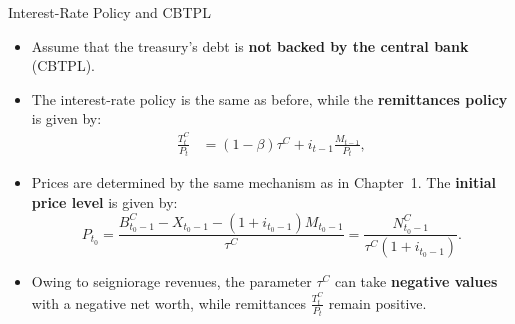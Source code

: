 \documentclass[11pt,aspectratio=169]{beamer}
\begin{document}
\begin{frame}{Interest-Rate Policy and CBTPL}
\small
\begin{itemize}

    \item Assume that the treasury’s debt is \textbf{not backed by the central bank} (CBTPL).

    \vspace{0.4em}

    \item The interest-rate policy is the same as before, while the \textbf{remittances policy} is given by:
    \begin{align}
        \frac{T_t^C}{P_t} 
        &= (1 - \beta)\tau^C + i_{t-1}\frac{M_{t-1}}{P_t},
        \label{2.23}
    \end{align}
    

    \vspace{0.4em}

    \item Prices are determined by the same mechanism as in Chapter~1.  
    The \textbf{initial price level} is given by:
    \begin{equation*}
        P_{t_0}
        = \frac{B_{t_0-1}^C - X_{t_0-1} - (1 + i_{t_0-1})M_{t_0-1}}{\tau^C}
        = \frac{N_{t_0-1}^C}{\tau^C(1 + i_{t_0-1})}.
    \end{equation*}

    \vspace{0.4em}

    \item Owing to seigniorage revenues, the parameter $\tau^C$ can take \textbf{negative values} with a negative net worth, 
    while remittances $\tfrac{T_t^C}{P_t}$ remain positive.

\end{itemize}

\end{frame}
\end{document}
